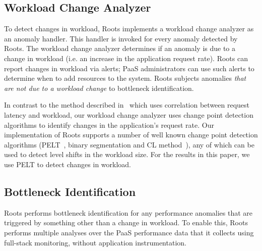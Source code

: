 
\subsection{Workload Change Analyzer}

To detect changes in workload, Roots implements a workload change analyzer as an anomaly handler. 
This handler is invoked for every anomaly detected by Roots.
The workload change analyzer determines if an anomaly is due to a change in workload (i.e.
an increase in the application request rate). Roots can report
changes in workload via alerts; PaaS administrators can use such alerts to determine when to
add resources to the system.
Roots subjects anomalies \textit{that are not due to a workload change} to bottleneck
identification.

In contrast to the method described 
in~\cite{Magalhaes:2010:DPA:1906485.1906774,
Magalhaes:2011:RAP:1982185.1982234} which uses correlation between request
latency and workload, our 
workload change analyzer uses change point detection algorithms to identify changes in
the application's request rate. 
Our implementation of Roots supports a number of well known change point
detection algorithms (PELT~\cite{doi:10.1080/01621459.2012.737745}, binary segmentation 
and CL method~\cite{chen1993joint}), any of which can be used to detect level shifts in the
workload size.  For the results in this paper, we use PELT to detect changes in workload.

\subsection{Bottleneck Identification}

Roots performs bottleneck identification for any performance
anomalies that are triggered by something other than a change in workload.
To enable this, Roots performs multiple analyses over the PaaS performance data that it
collects using full-stack monitoring, without application instrumentation.

